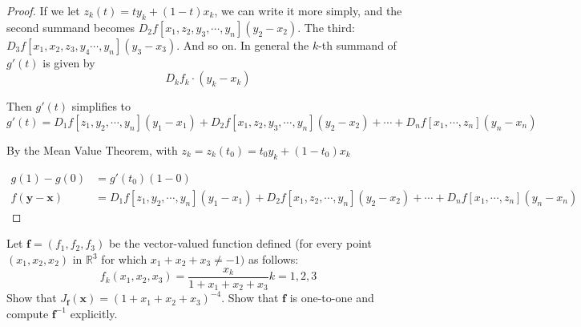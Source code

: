 \documentclass[12pt]{article}
\newcommand{\R}{\mathbb{R}}
\newcommand{\bvec}[1]{\textbf{#1}}
\newenvironment{problem}[2][Problem]{\begin{trivlist}
\item[\hskip \labelsep {\bfseries #1}\hskip \labelsep {\bfseries #2.}]}{\end{trivlist}}
\begin{document}
\begin{proof}
If we let $z_k(t)=ty_k+(1-t)x_k$, we can write it more simply, and the second summand becomes $D_2f[x_1,z_2,y_3,\cdots,y_n](y_2-x_2)$.
The third: $D_3f[x_1,x_2,z_3,y_4\cdots,y_n](y_3-x_3)$.
And so on. In general the $k$-th summand of $g'(t)$ is given by
\[D_kf_k\cdot(y_k-x_k)\]

Then $g'(t)$ simplifies to
\[
g'(t)=D_1f[z_1,y_2,\cdots,y_n](y_1-x_1)+D_2f[x_1,z_2,y_3,\cdots,y_n](y_2-x_2)+\cdots+D_nf[x_1,\cdots,z_n](y_n-x_n)
\]

By the Mean Value Theorem, with $z_k=z_k(t_0)=t_0y_k+(1-t_0)x_k$

\begin{align*}
    g(1)-g(0)&=g'(t_0)(1-0)\\
    f(\bvec{y}-\bvec{x})&=D_1f[z_1,y_2,\cdots,y_n](y_1-x_1)+D_2f[x_1,z_2,\cdots,y_n](y_2-x_2)+\cdots+D_nf[x_1,\cdots,z_n](y_n-x_n)
\end{align*}
\end{proof}
\vspace{6in}

\begin{problem}{Apos. 13.2}
Let $\bvec{f}=(f_1,f_2,f_3)$ be the vector-valued function defined (for every point $(x_1, x_2, x_2)$ in $\R^3$ for which $x_1+x_2+x_3\not=-1)$ as follows:
\[f_k(x_1,x_2,x_3)=\frac{x_k}{1+x_1+x_2+x_3} k=1,2,3\]
Show that $J_{\bvec{f}}(\bvec{x})=(1+x_1+x_2+x_3)^{-4}$. Show that $\bvec{f}$ is one-to-one and compute $\bvec{f}^{-1}$ explicitly.
\end{problem}
\end{document}
